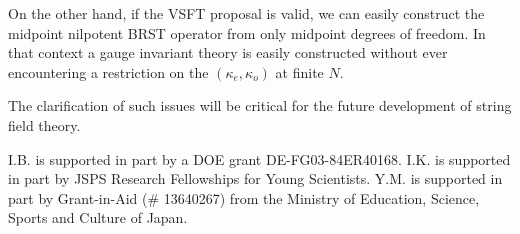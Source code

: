 \documentclass[a4paper,11pt]{article}
\begin{document}
On the other hand, if the VSFT proposal is valid, we can easily construct
the midpoint nilpotent BRST operator from only midpoint degrees of freedom.
In that context a gauge invariant theory is easily constructed without ever
encountering a restriction on the $\left( \kappa _{e},\kappa _{o}\right) $
at finite $N.$

The clarification of such issues will be critical for the future development
of string field theory.

\begin{center}
\end{center}

I.B. is supported in part by a DOE grant DE-FG03-84ER40168. I.K. is
supported in part by JSPS Research Fellowships for Young Scientists. Y.M. is
supported in part by Grant-in-Aid (\# 13640267) from the Ministry of
Education, Science, Sports and Culture of Japan.

\end{document}
